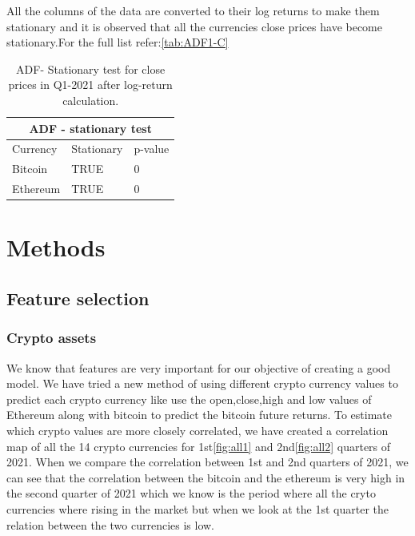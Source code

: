 \documentclass[final]{cvpr}
\begin{document}
All the columns of the data are converted to their log returns to make them stationary and it is observed that all the currencies close prices have become stationary.For the full list refer:\ref{tab:ADF1-C}


\begin{table}[h!]
\centering
 \begin{tabular}{ |p{2.5cm}|p{1.5cm}|p{1.5cm}|}
 \hline
 \multicolumn{3}{|c|}{\textbf{ADF - stationary test}} \\
 \hline
 Currency & Stationary & p-value \\
 \hline
 Bitcoin  & TRUE & 0 \\
 \hline
 Ethereum  & TRUE & 0  \\
 \hline

  \end{tabular}
  \caption{ADF- Stationary test for close prices in Q1-2021 after log-return calculation.}
 \label{tab:ADF1}
\end{table}
\section{Methods}

\subsection{Feature selection}
\subsubsection{Crypto assets}

We know that features are very important for our objective of creating a good model. We have tried a new method of using different crypto currency values to predict each crypto currency like use the open,close,high and low values of Ethereum along with bitcoin to predict the bitcoin future returns. To estimate which crypto values are more closely correlated, we have created a correlation map of all the 14 crypto currencies for 1st\ref{fig:all1} and 2nd\ref{fig:all2} quarters of 2021.  When we compare the correlation between 1st and 2nd quarters of 2021, we can see that the correlation between the bitcoin and the ethereum is very high in the second quarter of 2021 which we know is the period where all the cryto currencies where rising in the market but when we look at the 1st quarter the relation between the two currencies is low.
\end{document}
